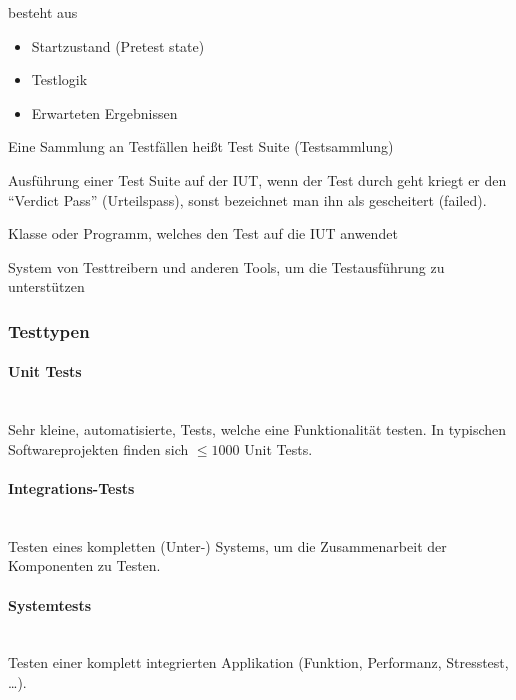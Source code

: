 \documentclass[ngerman,color=3b]{tuda_summary}
\begin{document}
\begin{definition}
    besteht aus\begin{itemize}
        \item Startzustand (Pretest state)
        \item Testlogik
        \item Erwarteten Ergebnissen
    \end{itemize}
\end{definition}
\begin{definition}
    Eine Sammlung an Testfällen heißt Test Suite (Testsammlung)
\end{definition}
\begin{definition}
    Ausführung einer Test Suite auf der IUT, wenn der Test durch geht kriegt er den \enquote{Verdict Pass} (Urteilspass), sonst bezeichnet man ihn als gescheitert (failed).
\end{definition}
\begin{definition}
    Klasse oder Programm, welches den Test auf die IUT anwendet
\end{definition}
\begin{definition}
    System von Testtreibern und anderen Tools, um die Testausführung zu unterstützen
\end{definition}

\subsubsection{Testtypen}
\paragraph{Unit Tests}\mbox{}\\
Sehr kleine, automatisierte, Tests, welche eine Funktionalität testen. In typischen Softwareprojekten finden sich $ \leq 1000 $ Unit Tests.

\paragraph{Integrations-Tests}\mbox{}\\
Testen eines kompletten (Unter-) Systems, um die Zusammenarbeit der Komponenten zu Testen.

\paragraph{Systemtests}\mbox{}\\
Testen einer komplett integrierten Applikation (Funktion, Performanz, Stresstest, \dots).
\clearpage
\end{document}
